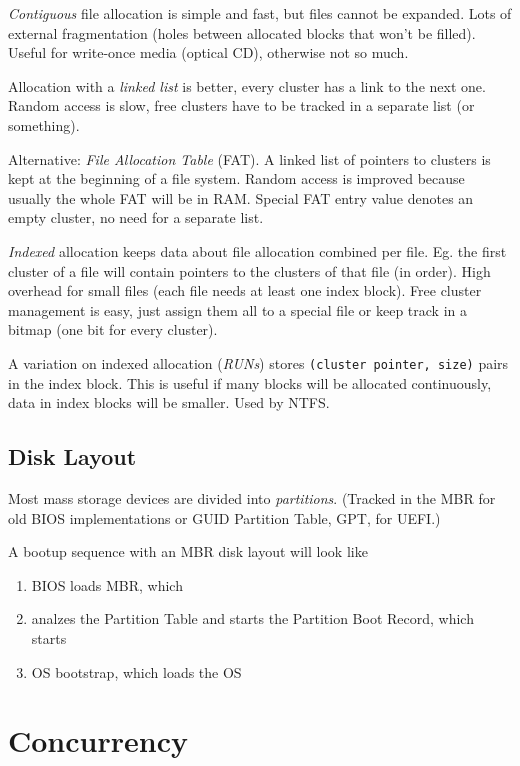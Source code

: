 \documentclass{article}
\newcommand{\code}[1]{\texttt{#1}}
\begin{document}
\begin{multicols}{1}
\emph{Contiguous} file allocation is simple and fast, but files cannot be expanded. Lots of external fragmentation (holes between allocated blocks that won't be filled). Useful for write-once media (optical CD), otherwise not so much.

Allocation with a \emph{linked list} is better, every cluster has a link to the next one. Random access is slow, free clusters have to be tracked in a separate list (or something).

Alternative: \emph{File Allocation Table} (FAT). A linked list of pointers to clusters is kept at the beginning of a file system. Random access is improved because usually the whole FAT will be in RAM. Special FAT entry value denotes an empty cluster, no need for a separate list.

\emph{Indexed} allocation keeps data about file allocation combined per file. Eg. the first cluster of a file will contain pointers to the clusters of that file (in order). High overhead for small files (each file needs at least one index block). Free cluster management is easy, just assign them all to a special file or keep track in a bitmap (one bit for every cluster).

A variation on indexed allocation (\emph{RUNs}) stores \code{(cluster pointer, size)} pairs in the index block. This is useful if many blocks will be allocated continuously, data in index blocks will be smaller. Used by NTFS.

\subsection*{Disk Layout}

Most mass storage devices are divided into \emph{partitions}. (Tracked in the MBR for old BIOS implementations or GUID Partition Table, GPT, for UEFI.)

A bootup sequence with an MBR disk layout will look like
\begin{enumerate}
    \item BIOS loads MBR, which
    \item analzes the Partition Table and starts the Partition Boot Record, which starts
    \item OS bootstrap, which loads the OS
\end{enumerate}

\section*{Concurrency}


\end{multicols}
\end{document}
